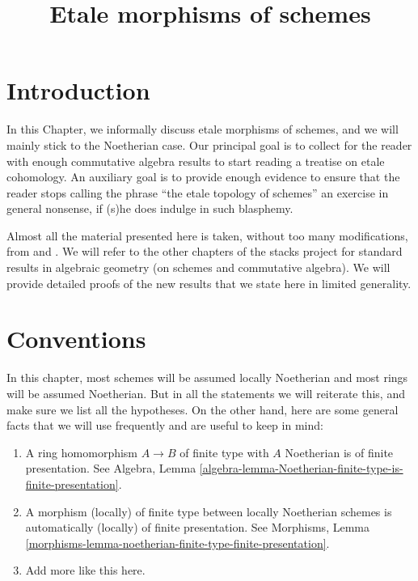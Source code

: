 

%


\title{Etale morphisms of schemes}

\maketitle

\label{section-phantom}

\tableofcontents



\section{Introduction}
\label{section-introduction}

\noindent
In this Chapter, we informally discuss etale morphisms of schemes,
and we will mainly stick to the Noetherian case. Our principal goal
is to collect for the reader with enough commutative algebra results
to start reading a treatise on etale cohomology. An auxiliary goal is to
provide enough evidence to ensure that the reader stops calling the phrase
``the etale topology of schemes'' an exercise in general nonsense, if (s)he
does indulge in such blasphemy.

\medskip\noindent
Almost all the material presented here is taken, without too many
modifications, from \cite{SGA1} and \cite{Ner}. We will refer to the other
chapters of the stacks project for standard results in algebraic geometry
(on schemes and commutative algebra). We will provide detailed
proofs of the new results that we state here in limited generality.




\section{Conventions}
\label{section-conventions}

\noindent
In this chapter, most schemes will be assumed locally Noetherian
and most rings will be assumed Noetherian. But in all the statements
we will reiterate this, and make sure we list all the hypotheses.
On the other hand, here are some general facts that we will use
frequently and are useful to keep in mind:
\begin{enumerate}
\item A ring homomorphism $A \to B$ of finite type with $A$ Noetherian
is of finite presentation. See Algebra,
Lemma \ref{algebra-lemma-Noetherian-finite-type-is-finite-presentation}.
\item A morphism (locally) of finite type between locally Noetherian schemes
is automatically (locally) of finite presentation.
See Morphisms,
Lemma \ref{morphisms-lemma-noetherian-finite-type-finite-presentation}.
\item Add more like this here.
\end{enumerate}




